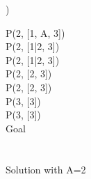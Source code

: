 \documentclass[12pt]{article}
\begin{document}
) \begin{multicols}{2}
\hspace*{0pt}\hfill P(2, [1, A, 3])\\
\hspace*{0pt}\hfill P(2, [1|2, 3])\\
\hspace*{0pt}\hfill P(2, [1|2, 3])\\
\hspace*{0pt}\hfill P(2, [2, 3])\\
\hspace*{0pt}\hfill P(2, [2, 3])\\
\hspace*{0pt}\hfill P(3, [3])\\
\hspace*{0pt}\hfill P(3, [3])\columnbreak\\
Goal\\\\\\
Solution with A=2\\
\end{multicols}



\noindent \hrulefill \\
\end{document}
